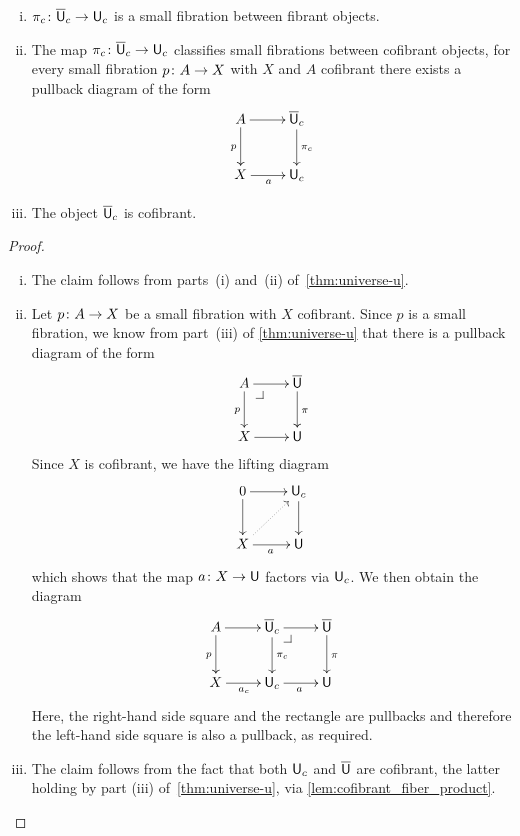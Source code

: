 \documentclass[reqno,10pt,a4paper,oneside,draft]{amsart}
\begin{document}
\begin{proposition} \label{thm:universe-uc} 
\hfill 
\begin{enumerate}[(i)] 
\item $\pi_c \colon \overline{\mathsf{U}}_c \to \mathsf{U}_c$ is a small fibration between fibrant objects. 
\item The map $\pi_c \colon \overline{\mathsf{U}}_c \to \mathsf{U}_c$ classifies small fibrations between cofibrant objects, \ie 
for every small fibration $p \colon A \to X$ with $X$ and $A$ cofibrant there exists a pullback diagram of the form
\[
\xymatrix{
A \ar[r] \ar[d]_p & \UU_c \ar[d]^{\pi_c} \\
X \ar[r]_a & \U_c }
\]
\item The object $\overline{\mathsf{U}}_c$ is cofibrant. 
\end{enumerate}
\end{proposition}

\begin{proof} \hfill
\begin{enumerate}[(i)] 
\item The claim follows from parts~(i) and~(ii) of~\cref{thm:universe-u}. 
\item Let $p \colon A \to X$ be a small fibration with $X$ cofibrant. Since $p$ is a
small fibration, we know 
from part~(iii) of \cref{thm:universe-u} that there is a pullback diagram of the form 
\[
\xymatrix{
A \ar[r] \ar[d]_p \drpullback & \UU \ar[d]^{\pi} \\
X \ar[r] & \U }
\]
Since $X$ is cofibrant, we have the lifting diagram
\[
\xymatrix{
0 \ar[r] \ar[d] & \U_c \ar[d]^{} \\
X \ar[r]_a \ar@{.>}[ur] & \U }
\]
which shows that the map $a \colon X \to \mathsf{U}$ factors via $\mathsf{U}_c$.  We then obtain the diagram
\[
\xymatrix{
A \ar[r] \ar[d]_p &  \UU_c \ar[r]  \ar[d]^{\pi_c} \drpullback & \UU \ar[d]^{\pi} \\
X \ar[r]_{a_c} & \U_c \ar[r]_{a} &  \U }
\]
Here, the right-hand side square and the rectangle are pullbacks and therefore the left-hand
side square is also a pullback, as required. 
\item The claim follows from the fact that both $\mathsf{U}_c$ and
$\overline{\mathsf{U}}$ are cofibrant, the latter holding by part (iii) of~\cref{thm:universe-u}, via \cref{lem:cofibrant_fiber_product}. \qedhere
\end{enumerate} 
\end{proof} 


\end{document}
